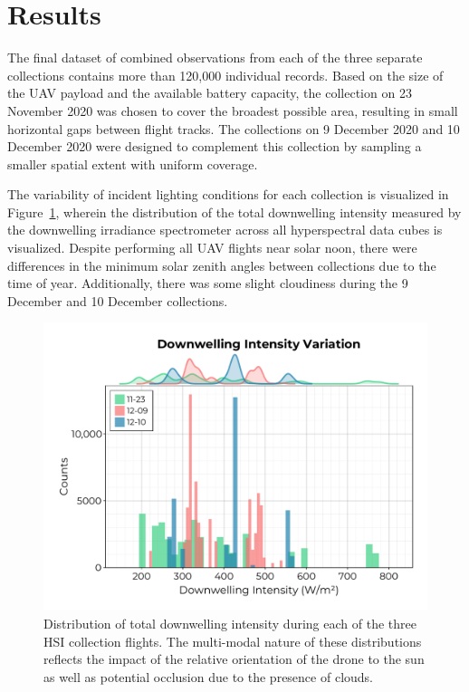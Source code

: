 \documentclass[remotesensing,article,accept,pdftex,moreauthors]{Definitions/mdpi}
\begin{document}
\section{Results}

The final dataset of combined observations from each of the three separate collections contains more than 120,000 individual records. Based on the size of the UAV payload and the available battery capacity, the collection on 23 November 2020 was chosen to cover the broadest possible area, resulting in small horizontal gaps between flight tracks. The collections on 9 December 2020 and 10 December 2020 were designed to complement this collection by sampling a smaller spatial extent with uniform coverage.

The variability of incident lighting conditions for each collection is visualized in Figure~\ref{fig:downwelling-hist}, wherein the distribution of the total downwelling intensity measured by the downwelling irradiance spectrometer across all hyperspectral data cubes is visualized. Despite performing all UAV flights near solar noon, there were differences in the minimum solar zenith angles between collections due to the time of year. Additionally, there was some slight cloudiness during the 9 December and 10 December collections. 

\begin{figure}[H]
\vspace{-0.1in}
\hspace{-9pt}\includegraphics[width=0.7\columnwidth]{figures/results/downwelling-hist.pdf}
\vspace{-0.15in}
\caption{Distribution of total downwelling intensity during each of the three HSI collection flights. The multi-modal nature of these distributions reflects the impact of the relative orientation of the drone to the sun as well as potential occlusion due to the presence of clouds.\label{fig:downwelling-hist}}
\end{figure}   
\end{document}
